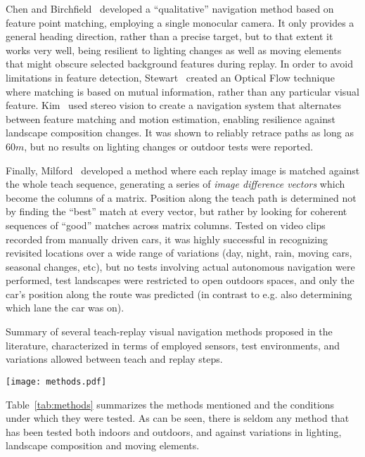 \documentclass[twocolumn, 9pt,fleqn]{jsproceedings}
\begin{document}
Chen and Birchfield~\cite{CHE06} developed a ``qualitative'' navigation method based on feature point matching, employing a single monocular camera. It only provides a general heading direction, rather than a precise target, but to that extent it works very well, being resilient to lighting changes as well as moving elements that might obscure selected background features during replay. In order to avoid limitations in feature detection, Stewart~\cite{STE12} created an Optical Flow technique where matching is based on mutual information, rather than any particular visual feature. Kim~\cite{KIM08} used stereo vision to create a navigation system that alternates between feature matching and motion estimation, enabling resilience against landscape composition changes. It was shown to reliably retrace paths as long as $60m$, but no results on lighting changes or outdoor tests were reported.

Finally, Milford~\cite{MIL12} developed a method where each replay image is matched against the whole teach sequence, generating a series of \textit{image difference vectors} which become the columns of a matrix. Position along the teach path is determined not by finding the ``best'' match at every vector, but rather by looking for coherent sequences of ``good'' matches across matrix columns. Tested on video clips recorded from manually driven cars, it was highly successful in recognizing revisited locations over a wide range of variations (day, night, rain, moving cars, seasonal changes, etc), but no tests involving actual autonomous navigation were performed, test landscapes were restricted to open outdoors spaces, and only the car's position along the route was predicted (in contrast to e.g. also determining which lane the car was on).

\begin{table}[t]
\centering
\caption{Summary of several teach-replay visual navigation methods proposed in the literature, characterized in terms of employed sensors, test environments, and variations allowed between teach and replay steps.}
\texttt{[image: methods.pdf]}
\vspace{-30pt}
\label{tab:methods}
\end{table}

Table~\ref{tab:methods} summarizes the methods mentioned and the conditions under which they were tested. As can be seen, there is seldom any method that has been tested both indoors and outdoors, and against variations in lighting, landscape composition and moving elements.
\end{document}
